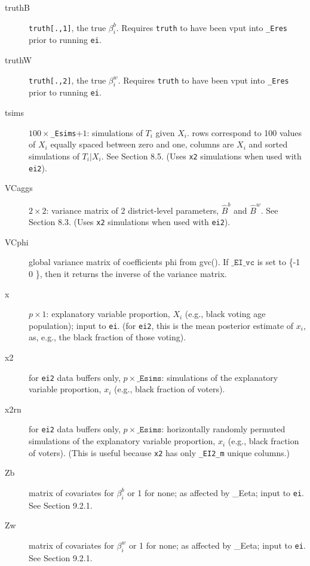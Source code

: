 \documentclass[11pt,titlepage]{article}
\begin{document}
\begin{description}
\item[truthB] \texttt{truth[.,1]}, the true $\beta_i^b$.  Requires
  \texttt{truth} to have been vput into \texttt{\_Eres} prior to
  running \texttt{ei}.

\item[truthW] \texttt{truth[.,2]}, the true $\beta_i^w$.  Requires
  \texttt{truth} to have been vput into \texttt{\_Eres} prior to
  running \texttt{ei}.

\item[tsims] $100\times$\texttt{\_Esims}$+1$: simulations of $T_i$
  given $X_i$.  rows correspond to 100 values of $X_i$ equally spaced
  between zero and one, columns are $X_i$ and sorted simulations of
  $T_i|X_i$.  See Section 8.5.  (Uses \texttt{x2} simulations when
  used with \texttt{ei2}).

\item[VCaggs] $2\times 2$: variance matrix of 2 district-level
  parameters, $\hat{B}^b$ and $\hat{B}^w$.  See Section 8.3.  (Uses
  \texttt{x2} simulations when used with \texttt{ei2}).

\item[VCphi] global variance matrix of coefficients phi from gvc(). If
  $\texttt{\_EI\_vc}$ is set to \{-1 0 \}, then it returns the inverse of
  the variance matrix. 

\item[x] $p\times 1$: explanatory variable proportion, $X_i$ (e.g.,
  black voting age population); input to \texttt{ei}.  (for
  \texttt{ei2}, this is the mean posterior estimate of $x_i$, as,
  e.g., the black fraction of those voting).

\item[x2] for \texttt{ei2} data buffers only,
  $p\times\texttt{\_Esims}$: simulations of the explanatory variable
  proportion, $x_i$ (e.g., black fraction of voters).

\item[x2rn] for \texttt{ei2} data buffers only,
  $p\times\texttt{\_Esims}$: horizontally randomly permuted
  simulations of the explanatory variable proportion, $x_i$ (e.g.,
  black fraction of voters).  (This is useful because \texttt{x2} has
  only \texttt{\_EI2\_m} unique columns.)

\item[Zb] matrix of covariates for $\beta_i^b$ or 1 for none; as
  affected by \_Eeta; input to \texttt{ei}.  See Section 9.2.1.

\item[Zw] matrix of covariates for $\beta_i^w$ or 1 for none; as
  affected by \_Eeta; input to \texttt{ei}.  See Section
  9.2.1.
\end{description}
\end{document}

